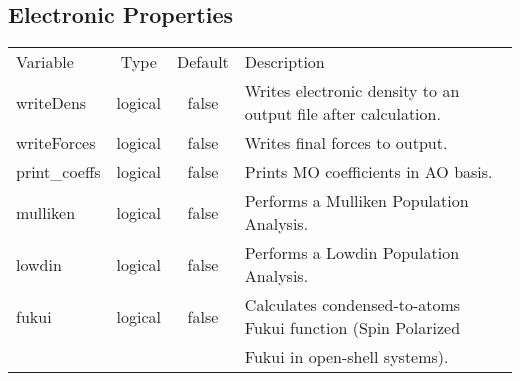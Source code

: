 \documentclass[journal=jctcce,manuscript=article]{achemso}
\begin{document}
    \subsection{Electronic Properties}
    \begin{table}  [H]
      \begin{center}
      \begin{tabular}{ l c c l}
         Variable & Type & Default & Description \\
         writeDens & logical & false & Writes electronic density to an output file after calculation. \\
         writeForces & logical & false & Writes final forces to output. \\
         print\_coeffs & logical & false & Prints MO coefficients in AO basis. \\
         mulliken & logical & false & Performs a Mulliken Population Analysis. \\
         lowdin & logical & false & Performs a Lowdin Population Analysis. \\
         fukui & logical & false & Calculates condensed-to-atoms Fukui function (Spin Polarized \\
            & & & Fukui in open-shell systems).
       \end{tabular}
       \end{center}
      \label{lio.properties.var}
    \end{table}
\end{document}
